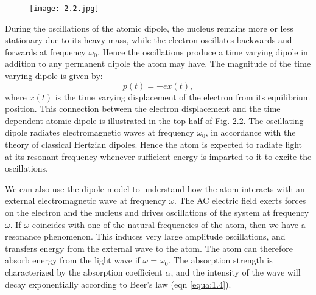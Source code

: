 \documentclass[12pt]{book}
\begin{document}
\begin{figure}[htbp]
  \texttt{[image: 2.2.jpg]}\\
  \label{fig:2.2}
\end{figure}


During the oscillations of the atomic dipole, the nucleus remains more or less stationary due to its heavy mass, while the electron oscillates backwards and forwards at frequency $\omega_0$. Hence the oscillations produce a time varying dipole in addition to any permanent dipole the atom may have. The magnitude of the time varying dipole is given by:
\begin{equation}\label{equa:2.4}
p(t) = -ex(t),
\end{equation}
where $x(t)$ is the time varying displacement of the electron from its equilibrium position. This connection between the electron displacement and the time dependent atomic dipole is illustrated in the top half of Fig. 2.2. The oscillating dipole radiates electromagnetic waves at frequency $\omega_0$, in accordance with the theory of classical Hertzian dipoles. Hence the atom is expected to radiate light at its resonant frequency whenever sufficient energy is imparted to it to excite the oscillations.


We can also use the dipole model to understand how the atom interacts with an external electromagnetic wave at frequency $\omega$. The AC electric field exerts forces on the electron and the nucleus and drives oscillations of the system at frequency $\omega$. If $\omega$ coincides with one of the natural frequencies of the atom, then we have a resonance phenomenon. This induces very large amplitude oscillations, and transfers energy from the external wave to the atom. The atom can therefore absorb energy from the light wave if $\omega=\omega_0$. The absorption strength is characterized by the absorption coefficient $\alpha$, and the intensity of the wave will decay exponentially according to Beer's law (eqn \ref{equa:1.4}).
\end{document}
